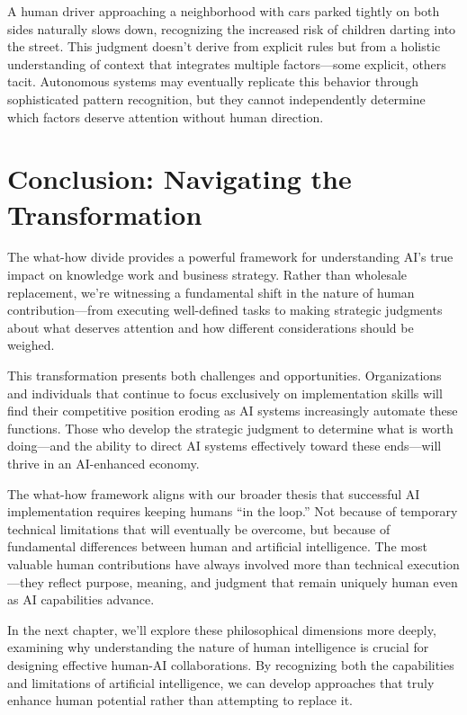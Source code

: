 \documentclass[
  Letterpaper,
]{scrbook}
\begin{document}
A human driver approaching a neighborhood with cars parked tightly on
both sides naturally slows down, recognizing the increased risk of
children darting into the street. This judgment doesn't derive from
explicit rules but from a holistic understanding of context that
integrates multiple factors---some explicit, others tacit. Autonomous
systems may eventually replicate this behavior through sophisticated
pattern recognition, but they cannot independently determine which
factors deserve attention without human direction.

\section{Conclusion: Navigating the
Transformation}\label{conclusion-navigating-the-transformation}

The what-how divide provides a powerful framework for understanding AI's
true impact on knowledge work and business strategy. Rather than
wholesale replacement, we're witnessing a fundamental shift in the
nature of human contribution---from executing well-defined tasks to
making strategic judgments about what deserves attention and how
different considerations should be weighed.

This transformation presents both challenges and opportunities.
Organizations and individuals that continue to focus exclusively on
implementation skills will find their competitive position eroding as AI
systems increasingly automate these functions. Those who develop the
strategic judgment to determine what is worth doing---and the ability to
direct AI systems effectively toward these ends---will thrive in an
AI-enhanced economy.

The what-how framework aligns with our broader thesis that successful AI
implementation requires keeping humans ``in the loop.'' Not because of
temporary technical limitations that will eventually be overcome, but
because of fundamental differences between human and artificial
intelligence. The most
valuable human contributions have always involved more than technical
execution---they reflect purpose, meaning, and judgment that remain
uniquely human even as AI capabilities advance.

In the next chapter, we'll explore these philosophical dimensions more
deeply, examining why understanding the nature of human intelligence is
crucial for designing effective human-AI collaborations. By recognizing
both the capabilities and limitations of artificial intelligence, we can
develop approaches that truly enhance human potential rather than
attempting to replace it.
\end{document}
